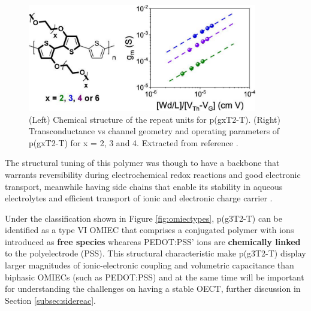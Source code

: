\begin{figure}[h]
	\centering
	\includegraphics[width=10cm]{Images/pdf/pg3t+perf.pdf}
	\caption[Chemical structure and transconductance of g2T-T with side-chain engineering]{(Left) Chemical structure of the repeat units for p(gxT2-T). (Right) Transconductance vs channel geometry and operating parameters of p(gxT2-T) for x = 2, 3 and 4. Extracted from reference \cite{moserEthyleneGlycolBasedSide2020}.}
	\label{fig:pg3t}
\end{figure}

The structural tuning of this polymer was though to have a backbone that warrants reversibility during electrochemical redox reactions and good electronic transport, meanwhile having side chains that enable its stability in aqueous electrolytes and efficient transport of ionic and electronic charge carrier \cite{moiaDesignEvaluationConjugated2019}. 



Under the classification shown in Figure \ref{fig:omiectypes}, p(g3T2-T) can be identified as a type VI OMIEC that comprises a conjugated polymer with ions introduced as \textbf{free species} wheareas PEDOT:PSS' ions are \textbf{chemically linked} to the polyelectrode (PSS). This structural characteristic make p(g3T2-T) display larger magnitudes of ionic-electronic coupling and volumetric capacitance than biphasic OMIECs (such as PEDOT:PSS) \cite{paulsenOrganicMixedIonic2020} and at the same time will be important for understanding the challenges on having a stable OECT, further discussion in Section \ref{subsec:sidereac}.


